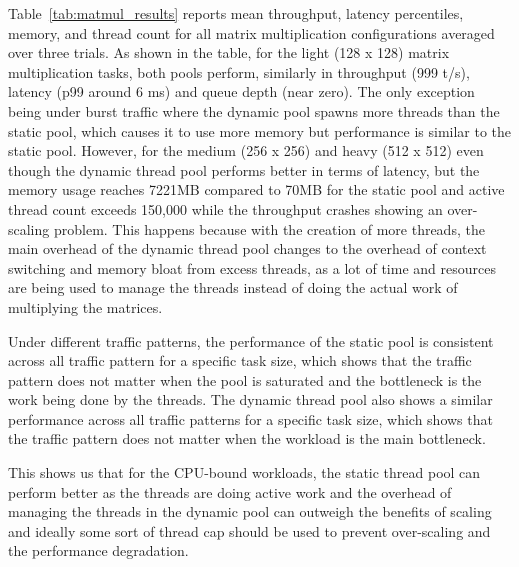 \documentclass[sigconf, 10pt]{acmart}
\begin{document}
Table~\ref{tab:matmul_results} reports mean throughput, latency percentiles, memory, and thread count for all matrix multiplication configurations averaged over three trials.
As shown in the table, for the light (128 x 128) matrix multiplication tasks, both pools perform, similarly in throughput (999 t/s), latency (p99 around 6 ms) and queue depth (near zero).
The only exception being under burst traffic where the dynamic pool spawns more threads than the static pool, which causes it to use more memory but performance is similar to the static pool.
However, for the medium (256 x 256) and heavy (512 x 512) even though the dynamic thread pool performs better in terms of latency, but the memory usage reaches 7221MB compared to 70MB for the static pool and active thread count exceeds 150,000 while the throughput crashes showing an over-scaling problem.
This happens because with the creation of more threads, the main overhead of the dynamic thread pool changes to the overhead of context switching and memory bloat from excess threads, as a lot of time and resources are being used to manage the threads instead of doing the actual work of multiplying the matrices.

Under different traffic patterns, the performance of the static pool is consistent across all traffic pattern for a specific task size, which shows that the traffic pattern does not matter when the pool is saturated and the bottleneck is the work being done by the threads.
The dynamic thread pool also shows a similar performance across all traffic patterns for a specific task size, which shows that the traffic pattern does not matter when the workload is the main bottleneck.

This shows us that for the CPU-bound workloads, the static thread pool can perform better as the threads are doing active work and the overhead of managing the threads in the dynamic pool can outweigh the benefits of scaling and ideally some sort of thread cap should be used to prevent over-scaling and the performance degradation.
\end{document}
